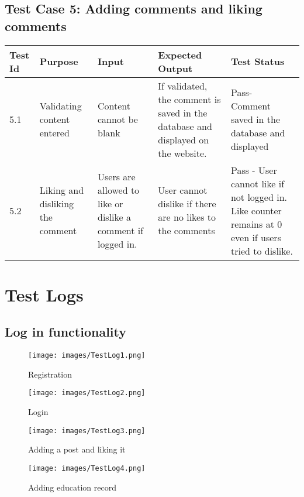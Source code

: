 \documentclass[12pt]{article}
\begin{document}
\subsection {Test Case 5: Adding comments and liking comments}
\begin{center}
	\begin{longtable}{ | p{2cm} | p{3cm} |  p{3cm} | p{3cm} | p{3cm} | }
		\hline
			\textbf{Test Id} & \textbf{Purpose} & \textbf{Input} & \textbf{Expected Output} & \textbf{Test Status} \\
		\hline
			5.1 & Validating content entered & Content cannot be blank & If validated, the comment  is saved in the database and displayed on the website. & Pass- Comment saved in the database and displayed\\
		\hline
			5.2 & Liking and disliking the comment & Users are allowed to like or dislike a comment if logged in.  & User cannot dislike if there are no likes to the comments & Pass - User cannot like if not logged in. Like counter remains at 0 even if users tried to dislike.\\
		\hline
	\end{longtable}
\end{center}
\pagebreak
	
\section{Test Logs}
\subsection{Log in functionality}
\begin{figure} [h]
    \centering
    \texttt{[image: images/TestLog1.png]}
    \caption{Registration}
\end{figure}

\begin{figure} 
    \centering
    \texttt{[image: images/TestLog2.png]}
    \caption{Login}
\end{figure}

\begin{figure} 
    \centering
    \texttt{[image: images/TestLog3.png]}
    \caption{Adding a post and liking it}
\end{figure}


\begin{figure}
    \centering
    \texttt{[image: images/TestLog4.png]}
    \caption{Adding education record}
\end{figure}
\end{document}
